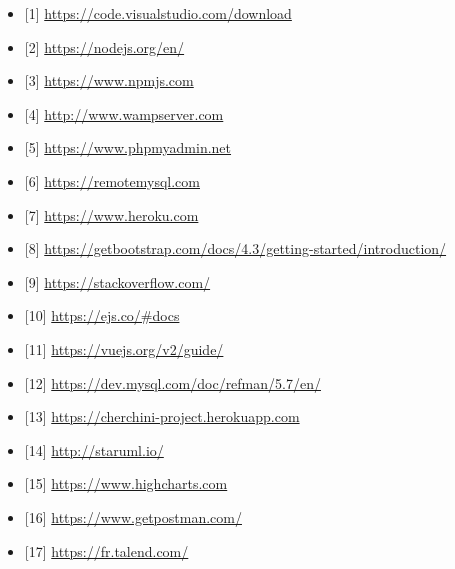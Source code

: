 \begin{itemize}
  \item {[1]  \url{https://code.visualstudio.com/download }  }
  \item { [2]  \url{https://nodejs.org/en/ }  }
  \item {  [3]  \url{https://www.npmjs.com} }
  \item {  [4]  \url{http://www.wampserver.com}}
  \item {  [5]  \url{https://www.phpmyadmin.net}  }
  \item {  [6]  \url{https://remotemysql.com}  }
  \item {  [7]  \url{https://www.heroku.com}  }
  \item { [8]  \url{https://getbootstrap.com/docs/4.3/getting-started/introduction/}   }
  \item { [9]  \url{https://stackoverflow.com/} }
  \item {  [10] \url{https://ejs.co/#docs} }
  \item {  [11] \url{https://vuejs.org/v2/guide/} }
  \item {  [12] \url{https://dev.mysql.com/doc/refman/5.7/en/}  }
  \item {   [13] \url{https://cherchini-project.herokuapp.com} }
  \item {   [14] \url{http://staruml.io/}  }
  \item {   [15] \url{https://www.highcharts.com}  }
  \item {  [16] \url{https://www.getpostman.com/} }
  \item {  [17] \url{https://fr.talend.com/} }
 \end{itemize} 